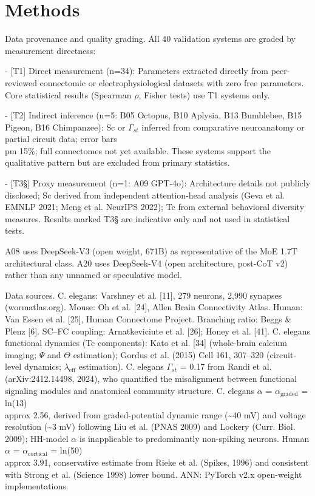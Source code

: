 \documentclass[a4paper,12pt]{article}
\begin{document}
\section{Methods}

Data provenance and quality grading. All 40 validation systems are graded by measurement directness:


- [T1] Direct measurement (n=34): Parameters extracted directly from peer-reviewed connectomic or electrophysiological datasets with zero free parameters. Core statistical results (Spearman $\rho$, Fisher tests) use T1 systems only.


- [T2\dag] Indirect inference (n=5: B05 Octopus, B10 Aplysia, B13 Bumblebee, B15 Pigeon, B16 Chimpanzee): Sc or $\Gamma_{st}$ inferred from comparative neuroanatomy or partial circuit data; error bars  \\pm 15\%; full connectomes not yet available. These systems support the qualitative pattern but are excluded from primary statistics.


- [T3\S{}] Proxy measurement (n=1: A09 GPT-4o): Architecture details not publicly disclosed; Sc derived from independent attention-head analysis (Geva et al. EMNLP 2021; Meng et al. NeurIPS 2022); Tc from external behavioral diversity measures. Results marked T3\S{} are indicative only and not used in statistical tests.


A08 uses DeepSeek-V3 (open weight, 671B) as representative of the MoE 1.7T architectural class. A20 uses DeepSeek-V4 (open architecture, post-CoT v2) rather than any unnamed or speculative model.


Data sources. C. elegans: Varshney et al. [11], 279 neurons, 2,990 synapses (wormatlas.org). Mouse: Oh et al. [24], Allen Brain Connectivity Atlas. Human: Van Essen et al. [25], Human Connectome Project. Branching ratio: Beggs \& Plenz [6]. SC--FC coupling: Arnatkeviciute et al. [26]; Honey et al. [41]. C. elegans functional dynamics (Tc components): Kato et al. [34] (whole-brain calcium imaging; $\Psi$ and $\Theta$ estimation); Gordus et al. (2015) Cell 161, 307--320 (circuit-level dynamics; $\lambda_{\text{eff}}$ estimation). C. elegans $\Gamma_{st}$ = 0.17 from Randi et al. (arXiv:2412.14498, 2024), who quantified the misalignment between functional signaling modules and anatomical community structure. C. elegans $\alpha$ = $\alpha_{\text{graded}}$ = ln(13)  \\approx  2.56, derived from graded-potential dynamic range (\textasciitilde{}40 mV) and voltage resolution (\textasciitilde{}3 mV) following Liu et al. (PNAS 2009) and Lockery (Curr. Biol. 2009); HH-model $\alpha$ is inapplicable to predominantly non-spiking neurons. Human $\alpha$ = $\alpha_{\text{cortical}}$ = ln(50)  \\approx  3.91, conservative estimate from Rieke et al. (Spikes, 1996) and consistent with Strong et al. (Science 1998) lower bound. ANN: PyTorch v2.x open-weight implementations.
\end{document}
